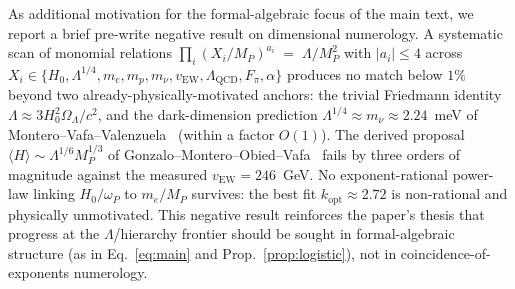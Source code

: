 \documentclass[aps,prd,superscriptaddress,nofootinbib,floatfix,10pt]{revtex4-2}
\theoremstyle{remark}
\begin{document}
As additional motivation for the formal-algebraic focus of the main
text, we report a brief pre-write negative result on dimensional
numerology. A systematic scan of monomial relations
$\prod_{i} (X_{i}/M_{P})^{a_{i}} \;=\; \Lambda/M_{P}^{2}$
with $|a_{i}|\le 4$ across
$X_{i}\in\{H_{0}, \Lambda^{1/4}, m_{e}, m_{p}, m_{\nu}, v_{\mathrm{EW}}, \Lambda_{\mathrm{QCD}}, F_{\pi}, \alpha\}$
produces no match below $1\%$ beyond two already-physically-motivated
anchors: the trivial Friedmann identity
$\Lambda \approx 3 H_{0}^{2}\Omega_{\Lambda}/c^{2}$, and the
dark-dimension prediction
$\Lambda^{1/4}\approx m_{\nu}\approx 2.24$~meV of
Montero--Vafa--Valenzuela~\cite{Montero2022} (within a factor
$O(1)$). The derived
proposal $\langle H\rangle \sim \Lambda^{1/6} M_{P}^{1/3}$ of
Gonzalo--Montero--Obied--Vafa~\cite{GonzaloMonteroObiedVafa2023}
fails by three orders of magnitude against the measured
$v_{\mathrm{EW}} = 246$~GeV. No exponent-rational power-law linking
$H_{0}/\omega_{P}$ to $m_{e}/M_{P}$ survives: the best fit
$k_{\mathrm{opt}} \approx 2.72$ is non-rational and physically
unmotivated. This negative result reinforces the paper's thesis that
progress at the $\Lambda$/hierarchy frontier should be sought in
formal-algebraic structure (as in Eq.~\eqref{eq:main} and
Prop.~\ref{prop:logistic}), not in coincidence-of-exponents
numerology.



\end{document}

